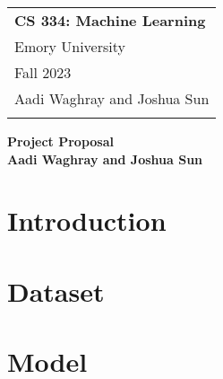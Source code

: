 \documentclass{article}
\begin{document}
\thispagestyle{empty}

\begin{tabular}{p{10.5cm}} 
	{\large \bf CS 334: Machine Learning} \\
	Emory University\\ Fall 2023  \\ Aadi Waghray and Joshua Sun\\
	\hline 
	\\
\end{tabular}

\vspace*{0.3cm}

\begin{center}
	{\Large \bf Project Proposal}\\
	\vspace*{0.02cm}
	{\bf Aadi Waghray and Joshua Sun}
\end{center}

\vspace{0.4cm}

\section{Introduction}


\section{Dataset}


\section{Model}

\end{document}
